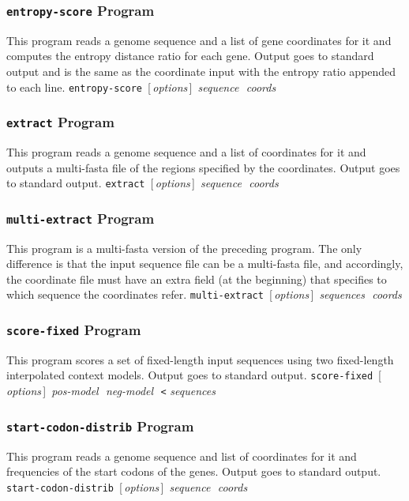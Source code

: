 \documentclass[fleqn,titlepage,11pt]{article}
\def\Desc#1{\,\mbox{\emph{#1}}\,}
\def\Pg#1{\texttt{#1}}
\begin{document}
\subsubsection{\Pg{entropy-score} Program}
This program reads a genome sequence and a list of gene coordinates
for it and computes the entropy distance ratio for each gene.
Output goes to standard output and is the same as the coordinate
input with the entropy ratio appended to each line.
\bq
  \Pg{entropy-score}\, [\Desc{options}] \Desc{sequence} \Desc{coords}
\eq

\subsubsection{\Pg{extract} Program}
This program reads a genome sequence and a list of coordinates
for it and outputs a multi-fasta file of the regions specified
by the coordinates.  Output goes to standard output.
\bq
  \Pg{extract}\, [\Desc{options}] \Desc{sequence} \Desc{coords}
\eq

\subsubsection{\Pg{multi-extract} Program}
This program is a multi-fasta version of the preceding program.
The only difference is that the input sequence file can be a
multi-fasta file, and accordingly, the coordinate file must have
an extra field (at the beginning) that specifies to which sequence
the coordinates refer.
\bq
  \Pg{multi-extract}\, [\Desc{options}] \Desc{sequences} \Desc{coords}
\eq

\subsubsection{\Pg{score-fixed} Program}
This program scores a set of fixed-length input sequences using
two fixed-length interpolated context models.  Output goes to
standard output.
\bq
  \Pg{score-fixed}\, [\Desc{options}] \Desc{pos-model} \Desc{neg-model} \,\Pg{<}\,\Desc{sequences}
\eq

\subsubsection{\Pg{start-codon-distrib} Program}
This program reads a genome sequence and list of coordinates
for it and frequencies of the start codons of the genes.
Output goes to standard output.
\bq
  \Pg{start-codon-distrib}\, [\Desc{options}] \Desc{sequence} \Desc{coords}
\eq
\end{document}

